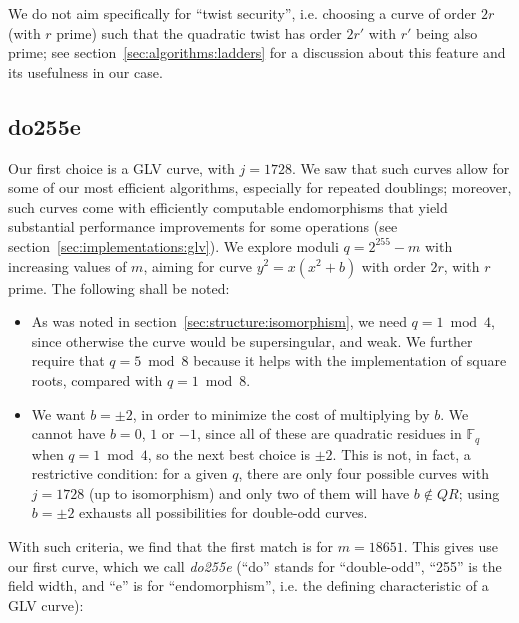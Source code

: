 \documentclass{llncs}
\newcommand{\QR}{QR}
\newcommand{\bF}{\mathbb{F}}
\begin{document}
We do not aim specifically for ``twist security'', i.e. choosing a curve
of order $2r$ (with $r$ prime) such that the quadratic twist has order
$2r'$ with $r'$ being also prime; see section~\ref{sec:algorithms:ladders}
for a discussion about this feature and its usefulness in our case.

\subsection{do255e}\label{sec:curveparams:do255e}

Our first choice is a GLV curve, with $j = 1728$. We saw that such
curves allow for some of our most efficient algorithms, especially for
repeated doublings; moreover, such curves come with efficiently
computable endomorphisms that yield substantial performance improvements
for some operations (see section~\ref{sec:implementations:glv}). We
explore moduli $q = 2^{255}-m$ with increasing values of $m$, aiming for
curve $y^2 = x(x^2 + b)$ with order $2r$, with $r$ prime. The following
shall be noted:
\begin{itemize}

    \item As was noted in section~\ref{sec:structure:isomorphism}, we
    need $q = 1\bmod 4$, since otherwise the curve would be
    supersingular, and weak. We further require that $q = 5\bmod 8$
    because it helps with the implementation of square roots, compared
    with $q = 1\bmod 8$.

    \item We want $b = \pm 2$, in order to minimize the cost of multiplying
    by $b$. We cannot have $b = 0$, $1$ or $-1$, since all of these are
    quadratic residues in $\bF_q$ when $q = 1\bmod 4$, so the next best
    choice is $\pm 2$. This is not, in fact, a restrictive condition:
    for a given $q$, there are only four possible curves with $j = 1728$
    (up to isomorphism) and only two of them will have $b \notin \QR$;
    using $b = \pm 2$ exhausts all possibilities for double-odd curves.

\end{itemize}

With such criteria, we find that the first match is for $m = 18651$.
This gives use our first curve, which we call \emph{do255e} (``do''
stands for ``double-odd'', ``255'' is the field width, and ``e'' is for
``endomorphism'', i.e. the defining characteristic of a GLV curve):
\end{document}
